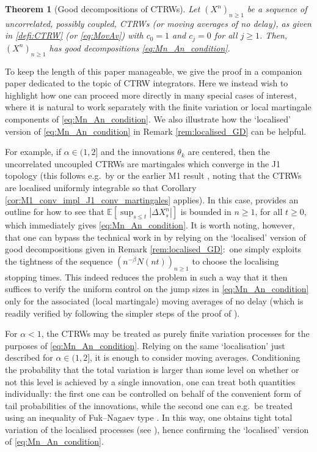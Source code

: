 \documentclass[11pt]{article}
\newtheorem{theorem}{Theorem}[section]
\theoremstyle{definition}\newtheorem{example}[theorem]{Example}
\theoremstyle{definition}\newtheorem{counterexample}[theorem]{Counterexample}
\theoremstyle{definition}\newtheorem{remark}[theorem]{Remark}
\theoremstyle{definition}\newtheorem{defi}[theorem]{Definition}
\numberwithin{equation}{section}
\renewcommand{\|}{\; : \, \;}											%
\begin{document}
\begin{theorem}[Good decompositions of CTRWs]\label{thm:CTRW_has_GD}
	Let $(X^n)_{n\ge 1}$ be a sequence of uncorrelated, possibly coupled, CTRWs (or moving averages of no delay), as given in \eqref{defi:CTRW} (or \eqref{eq:MovAv}) with $c_0= 1$ and $c_j=0$ for all $j\ge 1$. Then, $(X^n)_{n\ge 1}$ has good decompositions \eqref{eq:Mn_An_condition}.
\end{theorem}

To keep the length of this paper manageable, we give the proof in a companion paper \cite{andreasfabrice} dedicated to the topic of CTRW integrators. Here we instead wish to highlight how one can proceed more directly in many special cases of interest, where it is natural to work separately with the finite variation or local martingale components of \eqref{eq:Mn_An_condition}. We also illustrate how the `localised' version of \eqref{eq:Mn_An_condition} in Remark \ref{rem:localised_GD} can be helpful.

For example, if $\alpha\in (1,2]$ and the innovations $\theta_k$ are centered, then the uncorrelated uncoupled CTRWs are martingales which converge in the J1 topology (this follows e.g.~by \cite[Thm.~3.6]{henry_straka} or the earlier M1 result \cite[Thm.~3.1]{Becker-Kern}, noting that the CTRWs are localised uniformly integrable so that Corollary \ref{cor:M1_conv_impl_J1_conv_martingales} applies). In this case, \cite{Burr} provides an outline for how to see that $\mathbb{E}[\operatorname{sup}_{s\leq t}|\Delta X^n_s|]$ is bounded in $n\geq 1$, for all $t\geq0$, which immediately gives \eqref{eq:Mn_An_condition}. It is worth noting, however, that one can bypass the technical work in \cite[Lem.~2]{Burr} by relying on the `localised' version of good decompositions given in Remark \ref{rem:localised_GD}:~one simply exploits the tightness of the sequence $(n^{-\beta} N(nt))_{n\ge 1}$ to choose the localising stopping times. This indeed reduces the problem in such a way that it then suffices to verify the uniform control on the jump sizes in \eqref{eq:Mn_An_condition} only for the associated (local martingale) moving averages of no delay (which is readily verified by following the simpler steps of the proof of \cite[Thm.~2]{Burr}).

For $\alpha <1$, the CTRWs may be treated as purely finite variation processes for the purposes of \eqref{eq:Mn_An_condition}. Relying on the same `localisation' just described for $\alpha\in(1,2]$, it is enough to consider moving averages. Conditioning the probability that the total variation is larger than some level on whether or not this level is achieved by a single innovation, one can treat both quantities individually: the first one can be  controlled on behalf of the convenient form of tail probabilities of the innovations, while the second one can e.g.~be treated using an inequality of Fuk--Nagaev type \cite[Thm.~5.1(i)]{berger}. In this way, one obtains tight total variation of the localised processes (see \cite[Prop. 3.8]{andreasfabrice}), hence confirming the `localised' version of \eqref{eq:Mn_An_condition}.
\end{document}
